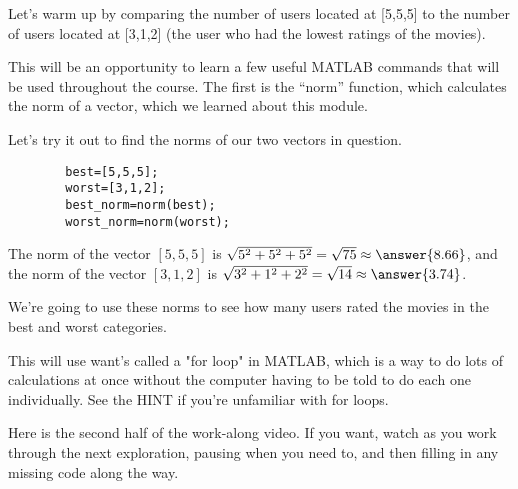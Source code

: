 \documentclass{ximera}
\begin{document}
  \begin{exploration}
  
 Let's warm up by comparing the number of users located at [5,5,5] to the number of users located at [3,1,2] (the user who had the lowest ratings of the movies).

  This will be an opportunity to learn a few useful MATLAB commands that will be used throughout the course. The first is the ``norm'' function, which calculates the norm of a vector, which we learned about this module.

  Let's try it out to find the norms of our two vectors in question. 

  \begin{remark}
    \begin{verbatim}
        best=[5,5,5];
        worst=[3,1,2];
        best_norm=norm(best);
        worst_norm=norm(worst);
    \end{verbatim}
  \end{remark}

  \begin{example}

    The norm of the vector $[5,5,5]$ is $\sqrt{5^2+5^2+5^2}=\sqrt{75}\approx \answer{8.66}$, and the norm of the vector $[3,1,2]$ is $\sqrt{3^2+1^2+2^2}=\sqrt{14}\approx \answer{3.74}$.

  \end{example}

  We're going to use these norms to see how many users rated the movies in the best and worst categories. 
  
  This will use want's called a "for loop" in MATLAB, which is a way to do lots of calculations at once without the computer having to be told to do each one individually. See the HINT if you're unfamiliar with for loops.

\begin{remark}

  Here is the second half of the work-along video. If you want, watch as you work through the next exploration, pausing when you need to, and then filling in any missing code along the way.

  \begin{center}
  \end{center}


\end{remark}
\end{exploration}
\end{document}
